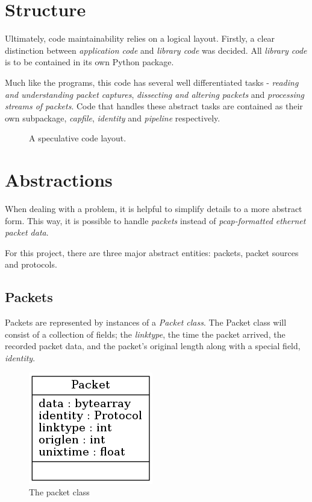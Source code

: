 \documentclass[10pt,a4paper,notitlepage]{report}
\begin{document}
\section{Structure}
Ultimately, code maintainability relies on a logical layout. Firstly, a clear distinction between \emph{application code} and \emph{library code} was decided. All \emph{library code} is to be contained in its own Python package.

Much like the programs, this code has several well differentiated tasks - \emph{reading and understanding packet captures}, \emph{dissecting and altering packets} and \emph{processing streams of packets}. Code that handles these abstract tasks are contained as their own subpackage, \emph{capfile}, \emph{identity} and \emph{pipeline} respectively.

\begin{figure}[H]
\caption{A speculative code layout.}
\label{fig:codelayout}
\end{figure}
\section{Abstractions}
When dealing with a problem, it is helpful to simplify details to a more abstract form. This way, it is possible to handle \emph{packets} instead of \emph{pcap-formatted ethernet packet data}.

For this project, there are three major abstract entities: packets, packet sources and protocols.

\subsection{Packets}
Packets are represented by instances of a \emph{Packet class}. The Packet class will consist of a collection of fields; the \emph{linktype}, the time the packet arrived, the recorded packet data, and the packet's original length along with a special field, \emph{identity}.

\begin{figure}
\center
\includegraphics[scale=0.7]{diagrams/packet.png}
\caption{The packet class}
\end{figure}
\end{document}
